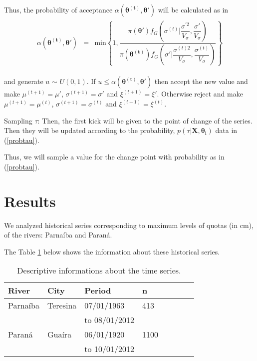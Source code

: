 \documentclass{asaproc}
\begin{document}
Thus, the probability of acceptance $\alpha(\boldsymbol{\theta^{(t)}},\boldsymbol{\theta '})$ will be calculated as in
\begin{eqnarray*}
\begin{array}{ccl}
\alpha(\boldsymbol{\theta^{(t)}},\boldsymbol{\theta '}) & = & \mbox{min} \left\{ 1, \dfrac{\pi\left(\boldsymbol{\theta'}\right)f_{G}\left(\sigma^{(t)} | \dfrac{\sigma^{'2}}{V_{\sigma}},\dfrac{\sigma '}{V_{\sigma}}\right)}{\pi(\boldsymbol{\theta^{(t)}})f_{G}\left(\sigma ' | \dfrac{\sigma^{(t)2}}{V_{\sigma}},\dfrac{\sigma^{(t)}}{V_{\sigma}}\right)} \right\}
\end{array}
\end{eqnarray*}

and generate $u$ $\sim$ $U(0,1)$. If $u \leq \alpha(\boldsymbol{\theta^{(t)}},\boldsymbol{\theta '})$ then accept the new value and make  $\mu^{(t+1)} = \mu '$, $\sigma^{(t+1)} = \sigma '$ and $\xi^{(t+1)} = \xi '$. Otherwise reject and make $\mu^{(t+1)} = \mu^{(t)}$, $\sigma^{(t+1)} = \sigma^{(t)}$ and $\xi^{(t+1)} = \xi^{(t)}$.

Sampling $\tau$: Then, the first kick will be given to the point of change of the series. Then they will be updated according to the probability, $p(\tau|\boldsymbol{X},\boldsymbol{\theta_{i}})$ data in (\ref{probtau}).

Thus, we will sample a value for the change point with probability as in (\ref{probtau}).

\section{Results}

We analyzed historical series corresponding to maximum levels of quotas (in cm), of the rivers: Parna\'iba and Paran\'a.

The Table \ref{descript} below shows the information about these historical series.

\begin{table}[H]
\caption{Descriptive informations about the time series.}\label{descript}
\centering
\begin{tabular}{llllllcc}
\hline
River& City & Period & n \\
\hline
Parna\'iba & Teresina & 07/01/1963  & 413\\
 & & to 08/01/2012 & \\
Paran\'a & Gua\'ira & 06/01/1920  & 1100 \\
 & & to 10/01/2012 & \\
\hline
\end{tabular}
\end{table}
\end{document}
